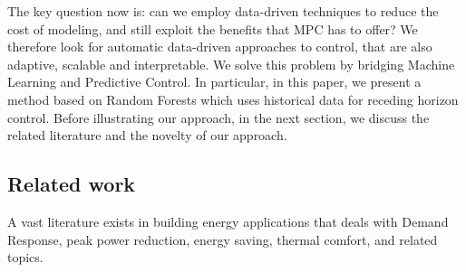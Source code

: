 \textcolor[rgb]{0,0,1}{The key question now is: can we employ data-driven techniques to reduce the cost of modeling, and still exploit the benefits that MPC has to offer?
We therefore look for automatic data-driven approaches to control, that are also adaptive, scalable and interpretable.
We solve this problem by bridging Machine Learning and Predictive Control. In particular, in this paper, we present a method based on Random Forests which uses historical data for receding horizon control. Before illustrating our approach, in the next section, we discuss the related literature and the novelty of our approach.}







\textcolor[rgb]{0,0,1}{
\subsection{Related work}
A vast literature exists in building energy applications that deals with Demand Response, peak power reduction, energy saving, thermal comfort, and related topics.
}

